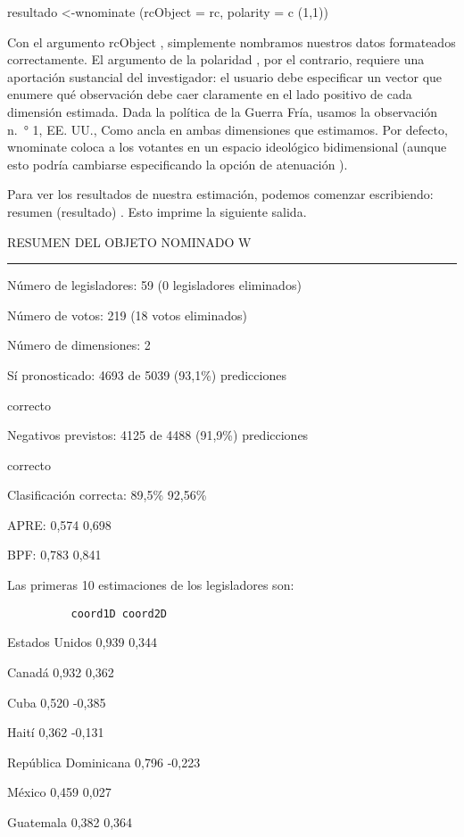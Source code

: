 \documentclass[
]{book}
\begin{document}
resultado \textless-wnominate (rcObject = rc, polarity = c (1,1))

Con el argumento rcObject , simplemente nombramos nuestros datos formateados correctamente. El argumento de la polaridad , por el contrario, requiere una aportación sustancial del investigador: el usuario debe especificar un vector que enumere qué observación debe caer claramente en el lado positivo de cada dimensión estimada. Dada la política de la Guerra Fría, usamos la observación n.~° 1, EE. UU., Como ancla en ambas dimensiones que estimamos. Por defecto, wnominate coloca a los votantes en un espacio ideológico bidimensional (aunque esto podría cambiarse especificando la opción de atenuación ).

Para ver los resultados de nuestra estimación, podemos comenzar escribiendo: resumen (resultado) . Esto imprime la siguiente salida.

RESUMEN DEL OBJETO NOMINADO W

\begin{center}\rule{0.5\linewidth}{0.5pt}\end{center}

Número de legisladores: 59 (0 legisladores eliminados)

Número de votos: 219 (18 votos eliminados)

Número de dimensiones: 2

Sí pronosticado: 4693 de 5039 (93,1\%) predicciones

correcto

Negativos previstos: 4125 de 4488 (91,9\%) predicciones

correcto

Clasificación correcta: 89,5\% 92,56\%

APRE: 0,574 0,698

BPF: 0,783 0,841

Las primeras 10 estimaciones de los legisladores son:

\begin{verbatim}
          coord1D coord2D
\end{verbatim}

Estados Unidos 0,939 0,344

Canadá 0,932 0,362

Cuba 0,520 -0,385

Haití 0,362 -0,131

República Dominicana 0,796 -0,223

México 0,459 0,027

Guatemala 0,382 0,364
\end{document}
